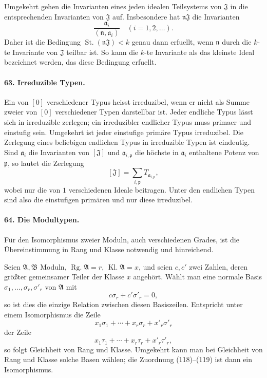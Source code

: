 \documentclass[11pt]{article}
\newcommand{\Rg}{\operatorname{Rg.}}
\newcommand{\Kl}{\operatorname{Kl.}}
\newcommand{\St}{\operatorname{St.}}
\begin{document}
Umgekehrt gehen die Invarianten eines jeden idealen Teilsystems von $\mathfrak J$ in die entsprechenden Invarianten von $\mathfrak J$ auf. Insbesondere hat $\mathfrak n\mathfrak J$ die Invarianten
\begin{equation}
  \frac{\mathfrak a_i}{(\mathfrak n,\mathfrak a_i)}\quad (i=1,2,
\ldots).
\tag{117}
\end{equation}
Daher ist die Bedingung $\St(\mathfrak n\mathfrak J)<k$ genau dann erfuellt, wenn $\mathfrak n$ durch die $k$-te Invariante von $\mathfrak J$ teilbar ist. So kann die $k$-te Invariante als das kleinste Ideal bezeichnet werden, das diese Bedingung erfuellt.

\paragraph{63. Irreduzible Typen.}
Ein von $[0]$ verschiedener Typus heisst irreduzibel, wenn er nicht als Summe zweier von $[0]$ verschiedener Typen darstellbar ist. Jeder endliche Typus lässt sich in irreduzible zerlegen; ein irreduzibler endlicher Typus muss primaer und einstufig sein. Umgekehrt ist jeder einstufige primäre Typus irreduzibel. Die Zerlegung eines beliebigen endlichen Typus in irreduzible Typen ist eindeutig. Sind $\mathfrak a_i$ die Invarianten von $[\mathfrak J]$ und $\mathfrak a_{i,\mathfrak p}$ die höchste in $\mathfrak a_i$ enthaltene Potenz von $\mathfrak p$, so lautet die Zerlegung
\[
  [\mathfrak J]=\sum_{i,\mathfrak p} T_{\mathfrak a_{i,\mathfrak p}},
\]
wobei nur die von $1$ verschiedenen Ideale beitragen. Unter den endlichen Typen sind also die einstufigen primären und nur diese irreduzibel.

\paragraph{64. Die Modultypen.}
Für den Isomorphismus zweier Moduln, auch verschiedenen Grades, ist die Übereinstimmung in Rang und Klasse notwendig und hinreichend.

Seien $\mathfrak A,\mathfrak B$ Moduln, $\Rg\mathfrak A=r$, $\Kl\mathfrak A=x$, und seien $c,c'$ zwei Zahlen, deren größter gemeinsamer Teiler der Klasse $x$ angehört. Wählt man eine normale Basis $\sigma_1,
\ldots,
\sigma_r,
\sigma'_r$ von $\mathfrak A$ mit
\[
  c\sigma_r+c'\sigma'_r=0,
\]
so ist dies die einzige Relation zwischen diesen Basiszeilen. Entspricht unter einem Isomorphismus die Zeile
\begin{equation}
  x_1\sigma_1+\cdots+x_r\sigma_r+x'_r\sigma'_r
\tag{118}
\end{equation}
der Zeile
\begin{equation}
  x_1\tau_1+\cdots+x_r\tau_r+x'_r\tau'_r,
\tag{119}
\end{equation}
so folgt Gleichheit von Rang und Klasse. Umgekehrt kann man bei Gleichheit von Rang und Klasse solche Basen wählen; die Zuordnung (118)--(119) ist dann ein Isomorphismus.
\end{document}
